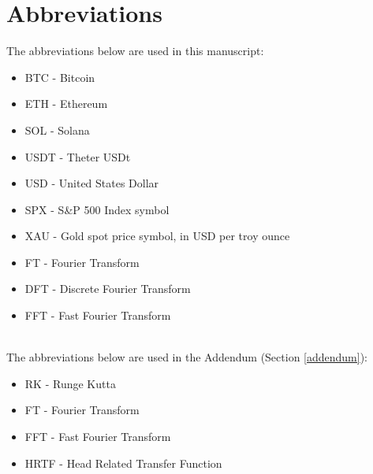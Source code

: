 \documentclass[a4paper, 10pt, conference]{ieeeconf}      %
\begin{document}
\section{Abbreviations}
The abbreviations below are used in this manuscript:
\begin{itemize}
    \item BTC - Bitcoin
    \item ETH - Ethereum
    \item SOL - Solana
    \item USDT - Theter USDt
    \item USD - United States Dollar
    \item SPX - S\&P 500 Index symbol
    \item XAU - Gold spot price symbol, in USD per troy ounce
    \item FT - Fourier Transform
    \item DFT - Discrete Fourier Transform
    \item FFT - Fast Fourier Transform
\end{itemize}
\\
The abbreviations below are used in the Addendum (Section \ref{addendum}):
\begin{itemize}
    \item RK - Runge Kutta
    \item FT - Fourier Transform
    \item FFT - Fast Fourier Transform
    \item HRTF - Head Related Transfer Function
\end{itemize}
\end{document}

